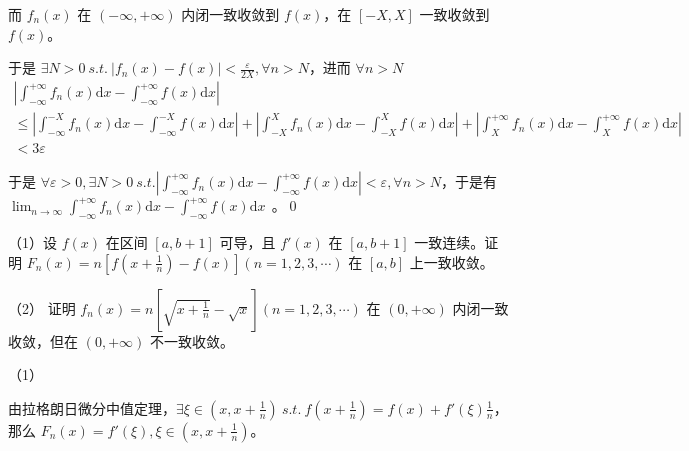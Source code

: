 而 $\displaystyle f_{n}( x)$ 在 $\displaystyle ( -\infty ,+\infty )$ 内闭一致收敛到 $\displaystyle f( x)$，在 $\displaystyle [ -X,X]$ 一致收敛到 $\displaystyle f( x)$。

于是 $\displaystyle \exists N >0\ s.t.\ |f_{n}( x) -f( x) |< \frac{\varepsilon }{2X} ,\forall n >N$，进而 $\displaystyle \forall n >N$
\begin{gather*}
\left| \int _{-\infty }^{+\infty } f_{n}( x)\mathrm{d} x-\int _{-\infty }^{+\infty } f( x)\mathrm{d} x\right| \\
\leqslant \left| \int _{-\infty }^{-X} f_{n}( x)\mathrm{d} x-\int _{-\infty }^{-X} f( x)\mathrm{d} x\right| +\left| \int _{-X}^{X} f_{n}( x)\mathrm{d} x-\int _{-X}^{X} f( x)\mathrm{d} x\right| +\left| \int _{X}^{+\infty } f_{n}( x)\mathrm{d} x-\int _{X}^{+\infty } f( x)\mathrm{d} x\right| \\
< 3\varepsilon 
\end{gather*}


于是 $\displaystyle \forall \varepsilon  >0,\exists N >0\ s.t.\left| \int _{-\infty }^{+\infty } f_{n}( x)\mathrm{d} x-\int _{-\infty }^{+\infty } f( x)\mathrm{d} x\right| < \varepsilon ,\forall n >N$，于是有 $\displaystyle \lim _{n\rightarrow \infty }\int _{-\infty }^{+\infty } f_{n}( x)\mathrm{d} x-\int _{-\infty }^{+\infty } f( x)\mathrm{d} x\ \ $。\qed 









\begin{ques}
	（1）设 $\displaystyle f( x)$ 在区间 $\displaystyle [ a,b+1]$ 可导，且 $\displaystyle f'( x)$ 在 $\displaystyle [ a,b+1]$ 一致连续。证明 $\displaystyle F_{n}( x) =n\left[ f\left( x+\frac{1}{n}\right) -f( x)\right]( n=1,2,3,\cdots )$ 在 $\displaystyle [ a,b]$ 上一致收敛。

（2） 证明 $\displaystyle f_{n}( x) =n\left[\sqrt{x+\frac{1}{n}} -\sqrt{x}\right]( n=1,2,3,\cdots )$ 在 $\displaystyle ( 0,+\infty )$ 内闭一致收敛，但在 $\displaystyle ( 0,+\infty )$ 不一致收敛。
\end{ques}





（1）

由拉格朗日微分中值定理，$\displaystyle \exists \xi \in \left( x,x+\frac{1}{n}\right) \ s.t.\ f\left( x+\frac{1}{n}\right) =f( x) +f'( \xi )\frac{1}{n}$，那么 $\displaystyle F_{n}( x) =f'( \xi ) ,\xi \in \left( x,x+\frac{1}{n}\right)$。

